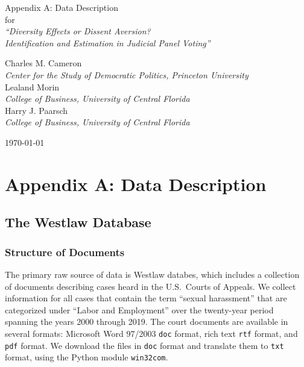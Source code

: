 \documentclass[11pt]{paper}
\begin{document}
\phantom{0}
\vspace{1.0in}


\begin{centering}

{\huge 
Appendix A: Data Description  \\
\bigskip
for \\
\bigskip
{\it ``Diversity Effects or Dissent Aversion? \\
Identification and Estimation in Judicial Panel Voting''} \\
}

\vspace{1.25in}


{\large 
Charles M. Cameron \\
{\it Center for the Study of Democratic Politics, Princeton University} \\
\medskip
Lealand Morin \\
{\it College of Business, University of Central Florida} \\
\medskip
Harry J. Paarsch \\
{\it College of Business, University of Central Florida} \\
}

\vspace{1.25in}



\today

\end{centering}


\pagebreak

\section*{Appendix A: Data Description}





\subsection*{The Westlaw Database}

\subsubsection*{Structure of Documents}

The primary raw source of data is Westlaw databes, 
which includes a collection of documents describing cases
heard in the U.S.~Courts of Appeals. 
We collect information for all cases that contain the term ``sexual harassment''
that are categorized under ``Labor and Employment''
over the twenty-year period spanning the years 2000 through 2019.  
The court documents are available in several formats: 
Microsoft Word 97/2003 \texttt{doc} format, 
rich text \texttt{rtf} format,
and \texttt{pdf} format. 
We download the files in \texttt{doc} format
and translate them to \texttt{txt} format, 
using the Python module \texttt{win32com}. 
\end{document}
